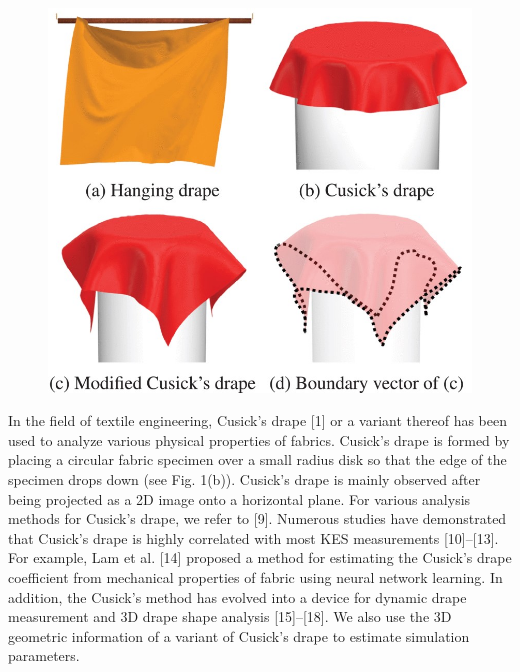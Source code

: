 \documentclass[twocolumn]{article}
\begin{document}
\begin{figure}
	\centering
	\includegraphics[width=0.7\linewidth]{choi1-3033765-large}
	\caption[Comparison of simulated hanging drape, Cusick’s drape, and our modified Cusick’s drape.]{}
	\label{fig:choi1-3033765-large}
\end{figure}

In the field of textile engineering, Cusick’s drape [1] or a variant thereof has been used to analyze various physical properties of fabrics. Cusick’s drape is formed by placing a circular fabric specimen over a small radius disk so that the edge of the specimen drops down (see Fig. 1(b)). Cusick’s drape is mainly observed after being projected as a 2D image onto a horizontal plane. For various analysis methods for Cusick’s drape, we refer to [9]. Numerous studies have demonstrated that Cusick’s drape is highly correlated with most KES measurements [10]–[13]. For example, Lam et al. [14] proposed a method for estimating the Cusick’s drape coefficient from mechanical properties of fabric using neural network learning. In addition, the Cusick’s method has evolved into a device for dynamic drape measurement and 3D drape shape analysis [15]–[18]. We also use the 3D geometric information of a variant of Cusick’s drape to estimate simulation parameters.
\end{document}
